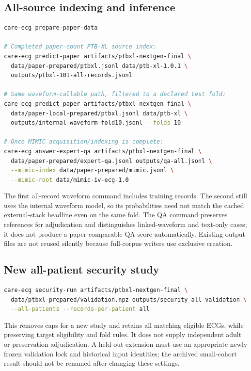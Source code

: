 \subsection{All-source indexing and inference}
\begin{lstlisting}[language=bash]
care-ecg prepare-paper-data

# Completed paper-count PTB-XL source index:
care-ecg predict-paper artifacts/ptbxl-nextgen-final \
  data/paper-prepared/ptbxl.jsonl data/ptb-xl-1.0.1 \
  outputs/ptbxl-101-all-records.jsonl

# Same waveform-callable path, filtered to a declared test fold:
care-ecg predict-paper artifacts/ptbxl-nextgen-final \
  data/paper-local-prepared/ptbxl.jsonl data/ptb-xl \
  outputs/internal-waveform-fold10.jsonl --folds 10

# Once MIMIC acquisition/indexing is complete:
care-ecg answer-expert-qa artifacts/ptbxl-nextgen-final \
  data/paper-prepared/expert-qa.jsonl outputs/qa-all.jsonl \
  --mimic-index data/paper-prepared/mimic.jsonl \
  --mimic-root data/mimic-iv-ecg-1.0
\end{lstlisting}
The first all-record waveform command includes training records. The second still uses the internal waveform model, so its probabilities need not match the cached external-stack headline even on the same fold. The QA command preserves references for adjudication and distinguishes linked-waveform and text-only cases; it does not produce a paper-comparable QA score automatically. Existing output files are not reused silently because full-corpus writers use exclusive creation.

\subsection{New all-patient security study}
\begin{lstlisting}[language=bash]
care-ecg security-run artifacts/ptbxl-nextgen-final \
  data/ptbxl-prepared/validation.npz outputs/security-all-validation \
  --all-patients --records-per-patient all
\end{lstlisting}
This removes caps for a new study and retains all matching eligible ECGs, while preserving target eligibility and fold rules. It does not supply independent adult or preservation adjudication. A held-out extension must use an appropriate newly frozen validation lock and historical input identities; the archived small-cohort result should not be renamed after changing these settings.

